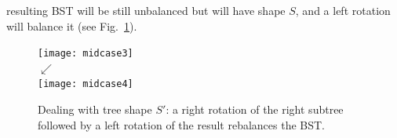 \documentclass[a4paper]{book}
\theoremstyle{changebreak}                %
\begin{document}
resulting BST will be still unbalanced but will have shape $S$, and a
left rotation will balance it (see
Fig.~\ref{f:leftrightrot}).
\begin{figure}[!ht]
\begin{center}
\texttt{[image: midcase3]}  \\ [-1em] $\swarrow$ \\ [-0.5em]
\texttt{[image: midcase4]}
\end{center}
\caption{Dealing with tree shape $S'$: a right
  rotation of the right subtree
  followed by a left rotation of the result
  rebalances the BST.}
\label{f:leftrightrot}
\end{figure}
\end{document}
